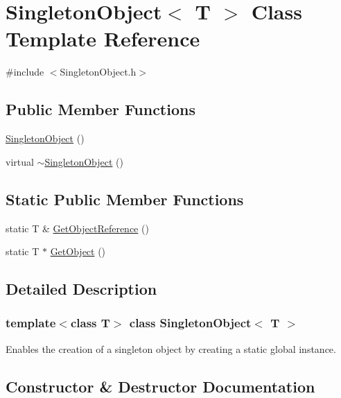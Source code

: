 \hypertarget{class_singleton_object}{}\section{Singleton\+Object$<$ T $>$ Class Template Reference}
\label{class_singleton_object}


{\ttfamily \#include $<$Singleton\+Object.\+h$>$}

\subsection*{Public Member Functions}
\begin{DoxyCompactItemize}
\item 
\mbox{\hyperlink{class_singleton_object_aed804192a73e9d8b935d9cbc6c817877}{Singleton\+Object}} ()
\item 
virtual \mbox{\hyperlink{class_singleton_object_ae8fbe0c316c1927836efd6c2712b892d}{$\sim$\+Singleton\+Object}} ()
\end{DoxyCompactItemize}
\subsection*{Static Public Member Functions}
\begin{DoxyCompactItemize}
\item 
static T \& \mbox{\hyperlink{class_singleton_object_adabe7b9f1b8ed85ec9a2e2b4a6d29aac}{Get\+Object\+Reference}} ()
\item 
static T $\ast$ \mbox{\hyperlink{class_singleton_object_aab1f7ff4e122cf6fc49217b620d55fd8}{Get\+Object}} ()
\end{DoxyCompactItemize}


\subsection{Detailed Description}
\subsubsection*{template$<$class T$>$\newline
class Singleton\+Object$<$ T $>$}

Enables the creation of a singleton object by creating a static global instance. 

\subsection{Constructor \& Destructor Documentation}
\mbox{\label{class_singleton_object_aed804192a73e9d8b935d9cbc6c817877}} 
